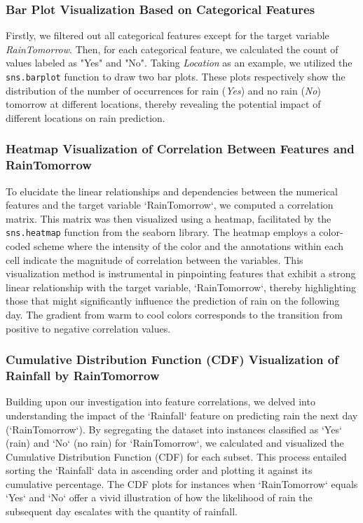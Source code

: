 \documentclass[12pt]{article}
\begin{document}
\subsubsection*{Bar Plot Visualization Based on Categorical Features}
Firstly, we filtered out all categorical features except for the target variable \textit{RainTomorrow}. Then, for each categorical feature, we calculated the count of values labeled as "Yes" and "No". Taking \textit{Location} as an example, we utilized the \texttt{sns.barplot} function to draw two bar plots. These plots respectively show the distribution of the number of occurrences for rain (\textit{Yes}) and no rain (\textit{No}) tomorrow at different locations, thereby revealing the potential impact of different locations on rain prediction.
\subsubsection*{Heatmap Visualization of Correlation Between Features and RainTomorrow}
To elucidate the linear relationships and dependencies between the numerical features and the target variable `RainTomorrow`, we computed a correlation matrix. This matrix was then visualized using a heatmap, facilitated by the \texttt{sns.heatmap} function from the seaborn library. The heatmap employs a color-coded scheme where the intensity of the color and the annotations within each cell indicate the magnitude of correlation between the variables. This visualization method is instrumental in pinpointing features that exhibit a strong linear relationship with the target variable, `RainTomorrow`, thereby highlighting those that might significantly influence the prediction of rain on the following day. The gradient from warm to cool colors corresponds to the transition from positive to negative correlation values.
\subsubsection*{Cumulative Distribution Function (CDF) Visualization of Rainfall by RainTomorrow}
Building upon our investigation into feature correlations, we delved into understanding the impact of the `Rainfall` feature on predicting rain the next day (`RainTomorrow`). By segregating the dataset into instances classified as `Yes` (rain) and `No` (no rain) for `RainTomorrow`, we calculated and visualized the Cumulative Distribution Function (CDF) for each subset. This process entailed sorting the `Rainfall` data in ascending order and plotting it against its cumulative percentage. The CDF plots for instances when `RainTomorrow` equals `Yes` and `No` offer a vivid illustration of how the likelihood of rain the subsequent day escalates with the quantity of rainfall. 
\end{document}
